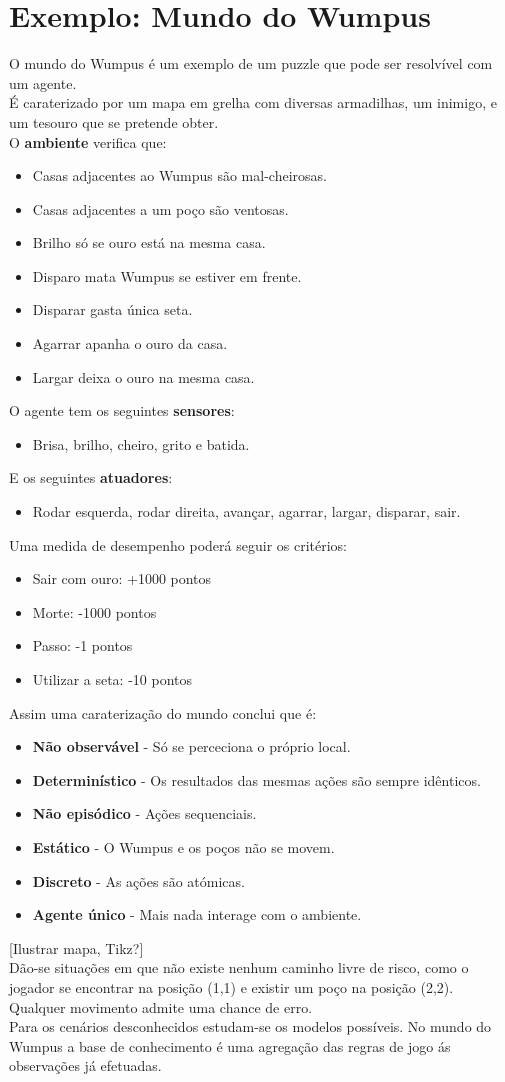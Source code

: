 \documentclass[]{report}
\begin{document}
\section{Exemplo: Mundo do Wumpus}
O mundo do Wumpus é um exemplo de um puzzle que pode ser resolvível com um agente.\\
É caraterizado por um mapa em grelha com diversas armadilhas, um inimigo, e um tesouro que se pretende obter.\\
O \textbf{ambiente} verifica que:
\begin{itemize}
\item Casas adjacentes ao Wumpus são mal-cheirosas.
\item Casas adjacentes a um poço são ventosas.
\item Brilho só se ouro está na mesma casa.
\item Disparo mata Wumpus se estiver em frente.
\item Disparar gasta única seta.
\item Agarrar apanha o ouro da casa.
\item Largar deixa o ouro na mesma casa.
\end{itemize}
O agente tem os seguintes \textbf{sensores}:
\begin{itemize}
\item Brisa, brilho, cheiro, grito e batida.
\end{itemize}
E os seguintes \textbf{atuadores}:
\begin{itemize}
\item Rodar esquerda, rodar direita, avançar, agarrar, largar, disparar, sair.
\end{itemize}
Uma medida de desempenho poderá seguir os critérios:
\begin{itemize}
\item Sair com ouro: +1000 pontos
\item Morte: -1000 pontos
\item Passo: -1 pontos
\item Utilizar a seta: -10 pontos
\end{itemize}
Assim uma caraterização do mundo conclui que é:
\begin{itemize}
\item \textbf{Não observável} - Só se perceciona o próprio local.
\item \textbf{Determinístico} - Os resultados das mesmas ações são sempre idênticos.
\item \textbf{Não episódico} - Ações sequenciais.
\item \textbf{Estático} - O Wumpus e os poços não se movem.
\item \textbf{Discreto} - As ações são atómicas.
\item \textbf{Agente único} - Mais nada interage com o ambiente.
\end{itemize}
[Ilustrar mapa, Tikz?]\\[0.5cm]
Dão-se situações em que não existe nenhum caminho livre de risco, como o jogador se encontrar na posição (1,1) e existir um poço na posição (2,2). Qualquer movimento admite uma chance de erro.\\
Para os cenários desconhecidos estudam-se os modelos possíveis.
No mundo do Wumpus a base de conhecimento é uma agregação das regras de jogo ás observações já efetuadas.
\end{document}
